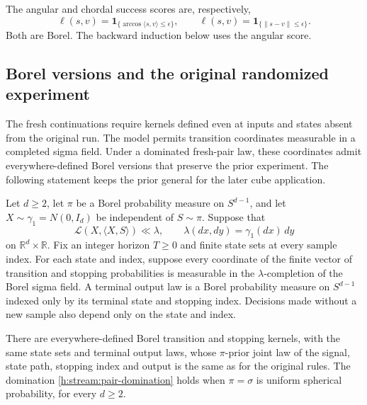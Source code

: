 The angular and chordal success scores are, respectively,
\[
 \ell(s,v)=\mathbf 1_{\{\arccos\langle s,v\rangle\le\epsilon\}},
 \qquad
 \ell(s,v)=\mathbf 1_{\{\|s-v\|\le\epsilon\}}.
\]
Both are Borel. The backward induction below uses the angular score.

\subsection{Borel versions and the original randomized experiment}
\label{h:stream:reduction}

The fresh continuations require kernels defined even at inputs and
states absent from the original run. The model permits transition
coordinates measurable in a completed sigma field. Under a dominated
fresh-pair law, these coordinates admit everywhere-defined Borel
versions that preserve the prior experiment. The following statement
keeps the prior general for the later cube application.


\begin{lemma}
\label{h:stream:borel}
Let $d\ge2$, let $\pi$ be a Borel probability measure on $S^{d-1}$,
and let $X\sim\gamma_1=N(0,I_d)$ be independent of $S\sim\pi$.
Suppose that
\begin{equation}\label{h:stream:pair-domination}
 \mathcal L(X,\langle X,S\rangle)\ll
 \lambda,\qquad \lambda(dx,dy)=\gamma_1(dx)\,dy
\end{equation}
on $\mathbb R^d\times\mathbb R$.
Fix an integer horizon $T\ge0$ and finite state sets at every sample
index. For each state and index, suppose every coordinate of the
finite vector of transition and stopping probabilities is measurable
in the $\lambda$-completion of the Borel sigma field. A terminal output
law is a Borel probability measure on $S^{d-1}$ indexed only by its
terminal state and stopping index. Decisions made without a new sample
also depend only on the state and index.

There are everywhere-defined Borel transition and stopping kernels,
with the same state sets and terminal output laws, whose $\pi$-prior
joint law of the signal, state path, stopping index and output is the
same as for the original rules. The domination
\eqref{h:stream:pair-domination} holds when $\pi=\sigma$ is uniform
spherical probability, for every $d\ge2$.
\end{lemma}

